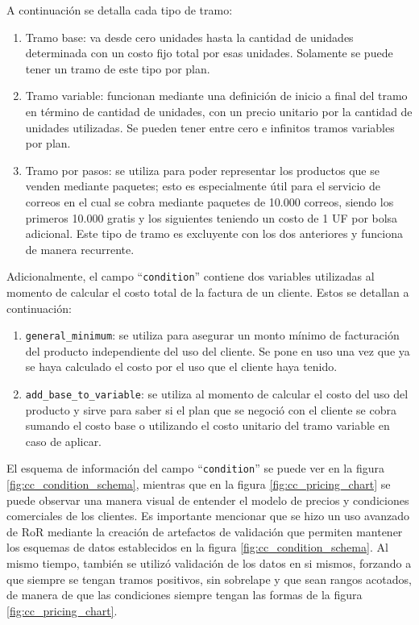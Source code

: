     A continuación se detalla cada tipo de tramo:
    \begin{enumerate}
      \item Tramo base: va desde cero unidades hasta la cantidad de unidades determinada con un costo fijo total por esas unidades. Solamente se puede tener un tramo de este tipo por plan.
      \item Tramo variable: funcionan mediante una definición de inicio a final del tramo en término de cantidad de unidades, con un precio unitario por la cantidad de unidades utilizadas. Se pueden tener entre cero e infinitos tramos variables por plan.
      \item Tramo por pasos: se utiliza para poder representar los productos que se venden mediante paquetes; esto es especialmente útil para el servicio de correos en el cual se cobra mediante paquetes de 10.000 correos, siendo los primeros 10.000 gratis y los siguientes teniendo un costo de 1 UF por bolsa adicional. Este tipo de tramo es excluyente con los dos anteriores y funciona de manera recurrente.
    \end{enumerate}
    
    Adicionalmente, el campo ``\texttt{condition}'' contiene dos variables utilizadas al momento de calcular el costo total de la factura de un cliente. Estos se detallan a continuación:
    \begin{enumerate}
      \item \texttt{general\_minimum}: se utiliza para asegurar un monto mínimo de facturación del producto independiente del uso del cliente. Se pone en uso una vez que ya se haya calculado el costo por el uso que el cliente haya tenido.
      \item \texttt{add\_base\_to\_variable}: se utiliza al momento de calcular el costo del uso del producto y sirve para saber si el plan que se negoció con el cliente se cobra sumando el costo base o utilizando el costo unitario del tramo variable en caso de aplicar.
    \end{enumerate}
    
    El esquema de información del campo ``\texttt{condition}'' se puede ver en la figura \ref{fig:cc_condition_schema}, mientras que en la figura \ref{fig:cc_pricing_chart} se puede observar una manera visual de entender el modelo de precios y condiciones comerciales de los clientes. Es importante mencionar que se hizo un uso avanzado de RoR mediante la creación de artefactos de validación que permiten mantener los esquemas de datos establecidos en la figura \ref{fig:cc_condition_schema}. Al mismo tiempo, también se utilizó validación de los datos en si mismos, forzando a que siempre se tengan tramos positivos, sin sobrelape y que sean rangos acotados, de manera de que las condiciones siempre tengan las formas de la figura \ref{fig:cc_pricing_chart}.
    
